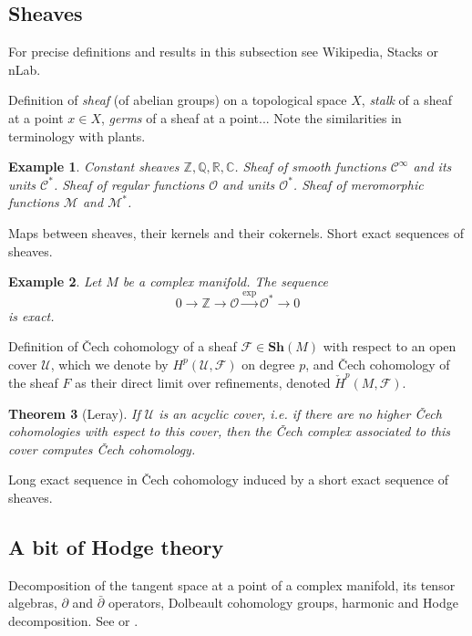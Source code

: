 \documentclass[12pt]{article}
\theoremstyle{darkgreentheorem}
\newtheorem{thm}{Theorem}[section]
\theoremstyle{darkbluedefinition}
\theoremstyle{darkredexample}
\newtheorem{exa}[thm]{Example}
\theoremstyle{remark}
\newcommand{\Z}{\mathbb{Z}}
\newcommand{\Q}{\mathbb{Q}}
\newcommand{\R}{\mathbb{R}}
\newcommand{\1}{\mathbbm{1}}
\newcommand{\C}{\mathbb{C}}
\newcommand{\Sh}{\mathbf{Sh}}
\newcommand{\calC}{\mathcal{C}}
\newcommand{\F}{\mathcal{F}}
\newcommand{\M}{\mathcal{M}}
\renewcommand{\O}{\mathcal{O}}
\newcommand{\U}{\mathcal{U}}
\begin{document}
\subsection{Sheaves}

For precise definitions and results in this subsection see Wikipedia, Stacks or nLab.

Definition of \textit{sheaf} (of abelian groups) on a topological space $X$, \textit{stalk} of a sheaf at a point $x\in X$, \textit{germs} of a sheaf at a point... Note the similarities in terminology with plants.

\begin{exa}
    Constant sheaves $\Z,\Q,\R,\C$.
    Sheaf of smooth functions $\calC^{\infty}$ and its units $\calC^{*}$.
    Sheaf of regular functions $\O$ and units $\O^{*}$.
    Sheaf of meromorphic functions $\M$ and $\M^{*}$.
\end{exa}

Maps between sheaves, their kernels and their cokernels.
Short exact sequences of sheaves.

\begin{exa}
    Let $M$ be a complex manifold.
    The sequence
    \[ 0\to \Z\to \O\xrightarrow{\exp} \O^{*}\to 0 \]
    is exact.
\end{exa}

Definition of \v{C}ech cohomology of a sheaf $\F\in \Sh(M)$ with respect to an open cover $\U$, which we denote by $H^{p}(\U,\F)$ on degree $p$, and \v{C}ech cohomology of the sheaf $F$ as their direct limit over refinements, denoted $\check{H}^{p}(M,\F)$.

\begin{thm}[Leray]
    If $\U$ is an acyclic cover, i.e. if there are no higher \v{C}ech cohomologies with espect to this cover, then the \v{C}ech complex associated to this cover computes \v{C}ech cohomology.
\end{thm}

Long exact sequence in \v{C}ech cohomology induced by a short exact sequence of sheaves.

\subsection{A bit of Hodge theory}

Decomposition of the tangent space at a point of a complex manifold, its tensor algebras, $\partial $ and $\bar{\partial }$ operators, Dolbeault cohomology groups, harmonic and Hodge decomposition.
See \cite{gh78} or \cite{voi07}.
\end{document}
